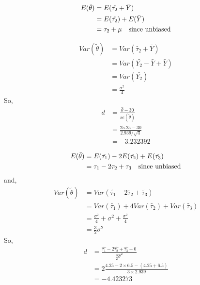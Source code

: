 \documentclass[12pt]{article}
\begin{document}
\begin{align*}
    E(\tilde{\theta}) & = E(\tilde{\tau_{2}} + \bar{Y}) \\
    & = E(\tilde{\tau_{2}}) + E(\bar{Y}) \\
    & = \tau_2 + \mu \text{\quad since unbiased}
\end{align*}

\begin{align*}
    Var(\tilde{\theta}) & = Var(\tilde{\tau_{2}} + \bar{Y}) \\
    & = Var(\bar{Y_2} - \bar{Y} + \bar{Y}) \\
    & = Var(\bar{Y_2}) \\
    & = \frac {\sigma^2} {4} 
\end{align*}
So,
\begin{align*}
    d & = \frac {\hat{\theta} - 30} {se(\tilde{\theta})} \\
    & = \frac {25.25 - 30} {2.939 / \sqrt{4}} \\
    & = -3.232392
\end{align*}

\begin{align*}
    E(\tilde{\theta}) & = E(\tilde{\tau_1}) - 2 E(\tilde{\tau_2}) + E(\tilde{\tau_3}) \\
    & = \tau_1 - 2 \tau_2 + \tau_3 \text{\quad since unbiased}
\end{align*}
and, 
\begin{align*}
    Var(\tilde{\theta}) & = Var(\tilde{\tau_1} - 2 \tilde{\tau_2} + \tilde{\tau_3}) \\
    & = Var(\tilde{\tau_1}) + 4 Var(\tilde{\tau_2}) + Var(\tilde{\tau_3}) \\
    & = \frac {\sigma^2} {4} + \sigma^2 + \frac {\sigma^2} {4} \\
    & = \frac 3 2 \sigma^2
\end{align*}
So,
\begin{align*}
    d & = \frac {\hat{\tau_1} - 2 \hat{\tau_2} + \hat{\tau_3} - 0} {\frac 3 2 \hat{\sigma}^2}\\
    & = 2 \frac {4.25 - 2 \times 6.5 - (4.25 + 6.5)} {3 \times 2.939} \\
    & = -4.423273
\end{align*}
\end{document}
